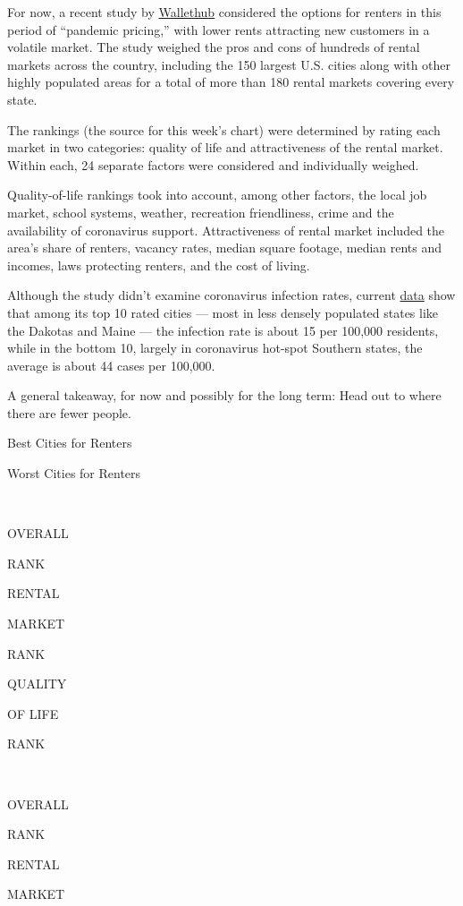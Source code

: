 For now, a recent study by
\href{https://wallethub.com/edu/best-cities-for-renters/23010/}{Wallethub}
considered the options for renters in this period of ``pandemic
pricing,'' with lower rents attracting new customers in a volatile
market. The study weighed the pros and cons of hundreds of rental
markets across the country, including the 150 largest U.S. cities along
with other highly populated areas for a total of more than 180 rental
markets covering every state.

The rankings (the source for this week's chart) were determined by
rating each market in two categories: quality of life and attractiveness
of the rental market. Within each, 24 separate factors were considered
and individually weighed.

Quality-of-life rankings took into account, among other factors, the
local job market, school systems, weather, recreation friendliness,
crime and the availability of coronavirus support. Attractiveness of
rental market included the area's share of renters, vacancy rates,
median square footage, median rents and incomes, laws protecting
renters, and the cost of living.

Although the study didn't examine coronavirus infection rates, current
\href{https://www.nytimes.com/interactive/2020/us/coronavirus-us-cases.html}{data}
show that among its top 10 rated cities --- most in less densely
populated states like the Dakotas and Maine --- the infection rate is
about 15 per 100,000 residents, while in the bottom 10, largely in
coronavirus hot-spot Southern states, the average is about 44 cases per
100,000.

A general takeaway, for now and possibly for the long term: Head out to
where there are fewer people.

Best Cities for Renters

Worst Cities for Renters

~

OVERALL

RANK

RENTAL

MARKET

RANK

QUALITY

OF LIFE

RANK

~

OVERALL

RANK

RENTAL

MARKET

